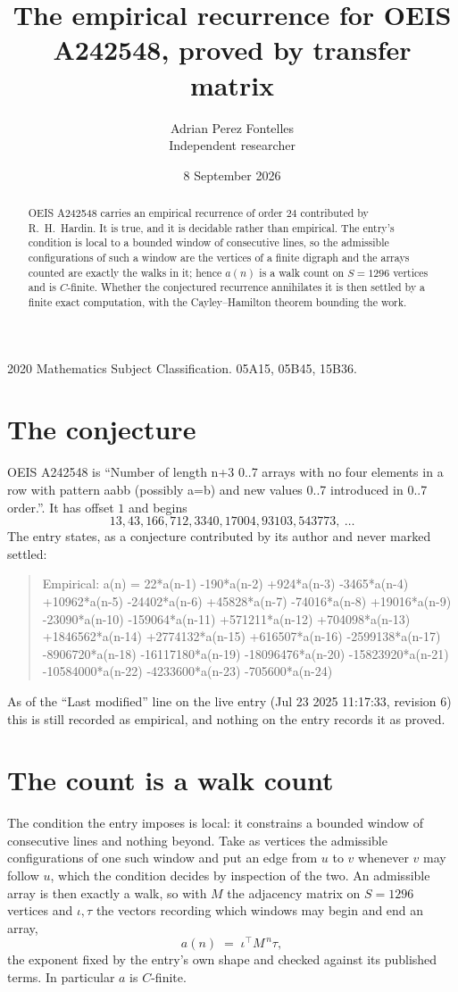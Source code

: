 \documentclass[11pt,a4paper]{article}
\title{The empirical recurrence for OEIS A242548, proved by transfer matrix}
\author{Adrian Perez Fontelles\\ \small Independent researcher}
\date{8 September 2026}
\theoremstyle{plain}
\theoremstyle{definition}
\begin{document}
\maketitle

\begin{abstract}
OEIS A242548 carries an empirical recurrence of order $24$ contributed by R.~H.~Hardin. It is
true, and it is decidable rather than empirical. The entry's condition is local to a bounded window of consecutive lines, so
the admissible configurations of such a window are the vertices of a finite digraph and the
arrays counted are exactly the walks in it; hence $a(n)$ is a walk count on $S=1296$ vertices
and is $C$-finite. Whether the conjectured recurrence annihilates it is then settled by a
finite exact computation, with the Cayley--Hamilton theorem bounding the work.
\end{abstract}

\noindent\small 2020 Mathematics Subject Classification. 05A15, 05B45, 15B36.\normalsize

\section{The conjecture}

OEIS A242548 is ``Number of length n+3 0..7 arrays with no four elements in a row with pattern aabb (possibly a=b) and new values 0..7 introduced in 0..7 order.''. It has offset $1$ and begins
\[
13, 43, 166, 712, 3340, 17004, 93103, 543773,\ \dots
\]
The entry states, as a conjecture contributed by its author and never marked settled:
\begin{quote}
Empirical: a(n) = 22*a(n-1) -190*a(n-2) +924*a(n-3) -3465*a(n-4) +10962*a(n-5) -24402*a(n-6) +45828*a(n-7) -74016*a(n-8) +19016*a(n-9) -23090*a(n-10) -159064*a(n-11) +571211*a(n-12) +704098*a(n-13) +1846562*a(n-14) +2774132*a(n-15) +616507*a(n-16) -2599138*a(n-17) -8906720*a(n-18) -16117180*a(n-19) -18096476*a(n-20) -15823920*a(n-21) -10584000*a(n-22) -4233600*a(n-23) -705600*a(n-24)
\end{quote}
As of the ``Last modified'' line on the live entry (Jul 23 2025 11:17:33, revision 6) this is still
recorded as empirical, and nothing on the entry records it as proved.

\section{The count is a walk count}

The condition the entry imposes is local: it constrains a bounded window of consecutive lines and nothing beyond. Take as
vertices the admissible configurations of one such window and put an edge from $u$ to $v$
whenever $v$ may follow $u$, which the condition decides by inspection of the two. An
admissible array is then exactly a walk, so with $M$ the adjacency matrix on $S=1296$ vertices
and $\iota,\tau$ the vectors recording which windows may begin and end an array,
\[
a(n)\;=\;\iota^{\!\top}M^{\,n}\tau ,
\]
the exponent fixed by the entry's own shape and checked against its published terms. In
particular $a$ is $C$-finite.
\end{document}
